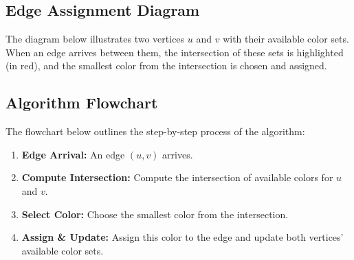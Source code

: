 \documentclass[11pt]{article}
\begin{document}
\subsection*{Edge Assignment Diagram}
The diagram below illustrates two vertices \(u\) and \(v\) with their available color sets. When an edge arrives between them, the intersection of these sets is highlighted (in red), and the smallest color from the intersection is chosen and assigned.

\begin{center}
\end{center}

\subsection*{Algorithm Flowchart}
The flowchart below outlines the step-by-step process of the algorithm:
\begin{enumerate}[noitemsep]
    \item \textbf{Edge Arrival:} An edge \((u,v)\) arrives.
    \item \textbf{Compute Intersection:} Compute the intersection of available colors for \(u\) and \(v\).
    \item \textbf{Select Color:} Choose the smallest color from the intersection.
    \item \textbf{Assign \& Update:} Assign this color to the edge and update both vertices’ available color sets.
\end{enumerate}
\end{document}
